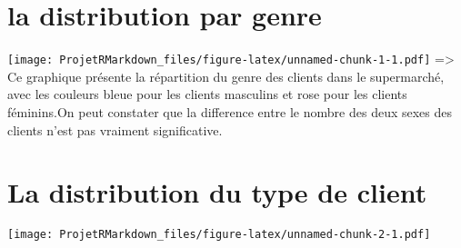 \documentclass[
]{article}
\newenvironment{Shaded}{\begin{snugshade}}{\end{snugshade}}
\newcommand{\AttributeTok}[1]{\textcolor[rgb]{0.13,0.29,0.53}{#1}}
\newcommand{\FunctionTok}[1]{\textcolor[rgb]{0.13,0.29,0.53}{\textbf{#1}}}
\newcommand{\NormalTok}[1]{#1}
\newcommand{\SpecialCharTok}[1]{\textcolor[rgb]{0.81,0.36,0.00}{\textbf{#1}}}
\newcommand{\StringTok}[1]{\textcolor[rgb]{0.31,0.60,0.02}{#1}}
\begin{document}
\hypertarget{la-distribution-par-genre}{%
\section{la distribution par genre}\label{la-distribution-par-genre}}

\begin{Shaded}
\end{Shaded}

\texttt{[image: ProjetRMarkdown\_files/figure-latex/unnamed-chunk-1-1.pdf]}
=\textgreater{} Ce graphique présente la répartition du genre des
clients dans le supermarché, avec les couleurs bleue pour les clients
masculins et rose pour les clients féminins.On peut constater que la
difference entre le nombre des deux sexes des clients n'est pas vraiment
significative.

\hypertarget{la-distribution-du-type-de-client}{%
\section{La distribution du type de
client}\label{la-distribution-du-type-de-client}}

\begin{Shaded}
\end{Shaded}

\texttt{[image: ProjetRMarkdown\_files/figure-latex/unnamed-chunk-2-1.pdf]}
\end{document}
